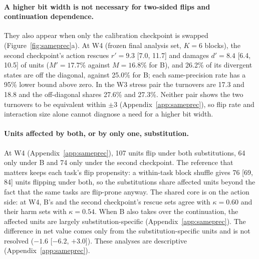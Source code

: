 \paragraph{A higher bit width is not necessary for two-sided flips and continuation dependence.} They also appear when only the calibration checkpoint is swapped (Figure~\ref{fig:sameprec}a). At W4 (frozen final analysis set, $K=6$ blocks), the second checkpoint's action rescues $r'=9.3$ [7.0, 11.7] and damages $d'=8.4$ [6.4, 10.5]\pp{} of units ($M'=17.7$\% against $M=16.8$\% for B), and 26.2\% of its divergent states are off the diagonal, against 25.0\% for B; each same-precision rate has a 95\% lower bound above zero. %
In the W3 stress pair the turnovers are 17.3 and 18.8\pp{} and the off-diagonal shares 27.6\% and 27.3\%. Neither pair shows the two turnovers to be equivalent within $\pm$3\pp{} (Appendix~\ref{app:sameprec}), so flip rate and interaction size alone cannot diagnose a need for a higher bit width. %

\paragraph{Units affected by both, or by only one, substitution.} At W4 (Appendix~\ref{app:sameprec}), 107 units flip under both substitutions, 64 only under B and 74 only under the second checkpoint. The reference that matters keeps each task's flip propensity: a within-task block shuffle gives 76 [69, 84] units flipping under both, so the substitutions share affected units beyond the fact that the same tasks are flip-prone anyway. %
The shared core is on the action side: at W4, B's and the second checkpoint's rescue sets agree with $\kappa=0.60$ and their harm sets with $\kappa=0.54$. When B also takes over the continuation, the affected units are largely substitution-specific (Appendix~\ref{app:sameprec}). The difference in net value comes only from the substitution-specific units and is not resolved ($-1.6$ [$-6.2$, $+3.0$]\pp{}). These analyses are descriptive (Appendix~\ref{app:sameprec}). %

